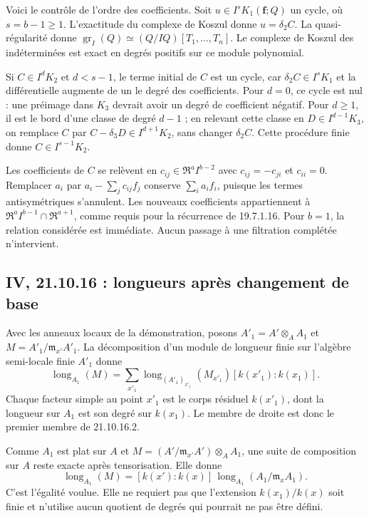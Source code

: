 \documentclass[11pt,a4paper]{article}
\begin{document}
Voici le contrôle de l'ordre des coefficients. Soit
$u\in I^sK_1(\mathbf f;Q)$ un cycle, où $s=b-1\geq1$.
L'exactitude du complexe de Koszul donne $u=\delta_2C$.
La quasi-régularité donne
$\operatorname{gr}_I(Q)\simeq(Q/IQ)[T_1,\ldots,T_n]$.
Le complexe de Koszul des indéterminées est exact en degrés positifs
sur ce module polynomial.

Si $C\in I^dK_2$ et $d<s-1$, le terme initial de $C$ est un cycle,
car $\delta_2C\in I^sK_1$ et la différentielle augmente de un le
degré des coefficients. Pour $d=0$, ce cycle est nul : une préimage
dans $K_3$ devrait avoir un degré de coefficient négatif. Pour
$d\geq1$, il est le bord d'une classe de degré $d-1$ ; en relevant
cette classe en $D\in I^{d-1}K_3$, on remplace $C$ par
$C-\delta_3D\in I^{d+1}K_2$, sans changer $\delta_2C$.
Cette procédure finie donne $C\in I^{s-1}K_2$.

Les coefficients de $C$ se relèvent en
$c_{ij}\in\mathfrak R^a I^{b-2}$ avec
$c_{ij}=-c_{ji}$ et $c_{ii}=0$. Remplacer $a_i$ par
$a_i-\sum_jc_{ij}f_j$ conserve $\sum_i a_if_i$, puisque les termes
antisymétriques s'annulent. Les nouveaux coefficients appartiennent
à $\mathfrak R^a I^{b-1}\cap\mathfrak R^{a+1}$, comme requis
pour la récurrence de 19.7.1.16. Pour $b=1$, la relation considérée
est immédiate. Aucun passage à une filtration complétée n'intervient.

\subsection{IV, 21.10.16 : longueurs après changement de base}
\label{note:iv4-lengths}
Avec les anneaux locaux de la démonstration, posons
$A'_1=A'\otimes_A A_1$ et $M=A'_1/\mathfrak m_{x'}A'_1$.
La décomposition d'un module de longueur finie sur l'algèbre
semi-locale finie $A'_1$ donne
\[
 \operatorname{long}_{A_1}(M)
 =\sum_{x'_1}\operatorname{long}_{(A'_1)_{x'_1}}(M_{x'_1})
       [k(x'_1):k(x_1)].
\]
Chaque facteur simple au point $x'_1$ est le corps résiduel $k(x'_1)$,
dont la longueur sur $A_1$ est son degré sur $k(x_1)$.
Le membre de droite est donc le premier membre de 21.10.16.2.

Comme $A_1$ est plat sur $A$ et
$M=(A'/\mathfrak m_{x'}A')\otimes_A A_1$, une suite de composition
sur $A$ reste exacte après tensorisation. Elle donne
\[
 \operatorname{long}_{A_1}(M)
 =[k(x'):k(x)]\,
   \operatorname{long}_{A_1}(A_1/\mathfrak m_xA_1).
\]
C'est l'égalité voulue. Elle ne requiert pas que l'extension
$k(x_1)/k(x)$ soit finie et n'utilise aucun quotient de degrés
qui pourrait ne pas être défini.
\par
\end{document}
